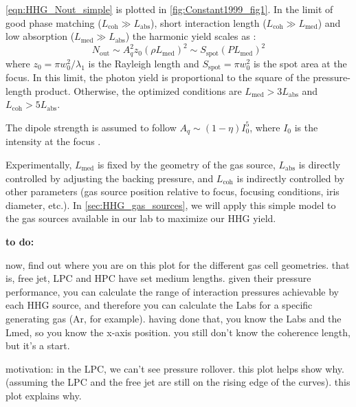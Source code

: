 \cref{eqn:HHG_Nout_simple} is plotted in \cref{fig:Constant1999_fig1}.  In the limit of good phase matching ($L_{\textrm{coh}} \gg L_{\textrm{abs}}$), short interaction length ($L_{\textrm{coh}} \gg L_{\textrm{med}}$) and low absorption ($L_{\textrm{med}} \gg L_{\textrm{abs}}$) the harmonic yield scales as \cite{takahashiGenerationStrongOptical2004}:
\begin{equation}
N_{\textrm{out}} \sim A_q^2 z_0 (\rho L_{\textrm{med}})^2 \sim S_{\textrm{spot}} (P L_{\textrm{med}})^2
\label{eqn:HHG_Nout_2}
\end{equation}
where $z_0 = \pi w_0^2 / \lambda_1$ is the Rayleigh length and $S_{\textrm{spot}} = \pi w_0^2$ is the spot area at the focus. In this limit, the photon yield is proportional to the square of the pressure-length product. Otherwise, the optimized conditions are $L_{\textrm{med}} > 3 L_{\textrm{abs}}$ and $L_{\textrm{coh}} > 5 L_{\textrm{abs}}$.

The dipole strength is assumed to follow $A_q \sim (1-\eta)I_0^5$, where $I_0$ is the intensity at the focus \cite{krauseCalculationPhotoemissionAtoms1992,kuhnELIALPSFacilityNext2017}.

Experimentally, $L_{\textrm{med}}$ is fixed by the geometry of the gas source, $L_{\textrm{abs}}$ is directly controlled by adjusting the backing pressure, and $L_{\textrm{coh}}$ is indirectly controlled by other parameters (gas source position relative to focus, focusing conditions, iris diameter, etc.). In \cref{sec:HHG_gas_sources}, we will apply this simple model to the gas sources available in our lab to maximize our HHG yield.

\textbf{to do:}

now, find out where you are on this plot for the different gas cell geometries. that is, free jet, LPC and HPC have set medium lengths. given their pressure performance, you can calculate the range of interaction pressures achievable by each HHG source, and therefore you can calculate the Labs for a specific generating gas (Ar, for example). having done that, you know the Labs and the Lmed, so you know the x-axis position. you still don't know the coherence length, but it's a start.

motivation: in the LPC, we can't see pressure rollover. this plot helps show why. (assuming the LPC and the free jet are still on the rising edge of the curves). this plot explains why.

